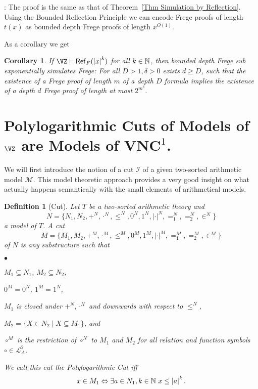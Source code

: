 \documentclass{LMCS}
\newcommand{\Nat}{\ensuremath \mathbb N}
\newcommand{\abs}[1]{\left\vert#1\right\vert}
\newtheorem{corollary}[theorem]{Corollary}
\newtheorem{definition}{Definition}[section]
\newenvironment{proof}{\QuadSpace\par\noindent{\bf
Proof}:}{\EndProof\HalfSpace} \fi
\newcommand{\QuadSpace}{}\newcommand{\HalfSpace}{}\newcommand{\FullSpace}{}\newcommand{\EndProof}{ \hfill \vrule width 1ex height 1ex depth 0pt }
\newenvironment{proof}{

\smallskip
\noindent\emph{Proof.}}{\hfill\(\Box\)
\bigskip
} \fi
\begin{document}
\begin{proof}
  The proof is the same as that of Theorem~\ref{Thm Simulation by
  Reflection}. Using the Bounded Reflection Principle we can encode
  Frege proofs of length $t(x)$ as bounded depth Frege proofs of length $x^{O(1)}$.
\end{proof}

As a corollary we get



\begin{corollary}
  If $\VZ\vdash \mathsf{Ref}_{F}(\abs{x}^k)$ for all $k\in\Nat$, then
  bounded depth Frege sub exponentially simulates Frege:
  For all $D>1,\delta>0$ exists $d\geq D$, such that the existence of a Frege proof of length $m$ of a depth $D$ formula
  implies the existence of a depth $d$ Frege proof of length at most $2^{m^{\delta}}$.
\end{corollary}


\section{Polylogarithmic Cuts of Models of $\VZ$ are Models of $\mathbf{VNC}^1$.}\label{Sec:Polylog Cuts}

We will first introduce the notion of a cut $\mathcal I$ of a given two-sorted arithmetic model $\mathcal M$.
This model theoretic approach provides a very good insight on what actually happens semantically with the small
elements of arithmetical models.

\begin{definition}
  [Cut] Let $T$ be a two-sorted arithmetic theory and
  $$N=\{N_1,N_2,+^{N},\cdot^{N},\leq^{N},0^N,1^N,
  \abs{\cdot}^{N},=^{N}_1,=^{N}_2,\in^{N}\}$$ a model of $T$.
  A {\em cut} $$M=\{M_1,M_2,+^{M},\cdot^{M},\leq^{M},0^M,1^M,
  \abs{\cdot}^{M},=^{M}_1,=^{M}_2,\in^{M}\}$$ of $N$ is any substructure
  such that
  \begin{iteMize}{$\bullet$}
    \item $M_1\subseteq N_1$, $M_2\subseteq N_2$,
    \item $0^M=0^N$, $1^M=1^N$,
    \item $M_1$ is closed under $+^{N},\cdot^{N}$ and downwards with respect to $\leq^{N}$,
    \item $M_2 =\{ X\in N_2\mid X\subseteq M_1\}$, and
    \item $\circ^{M}$ is the restriction of $\circ^{N}$ to $M_1$ and $M_2$ for all
          relation and function symbols $\circ\in\mathcal L_{A}^2$.
  \end{iteMize}
  We call this cut the {\em Polylogarithmic Cut} iff
  $$x\in M_1\Leftrightarrow \exists a\in N_1, k\in \Nat\ x\leq\abs{a}^k.$$
\end{definition}
\end{document}
